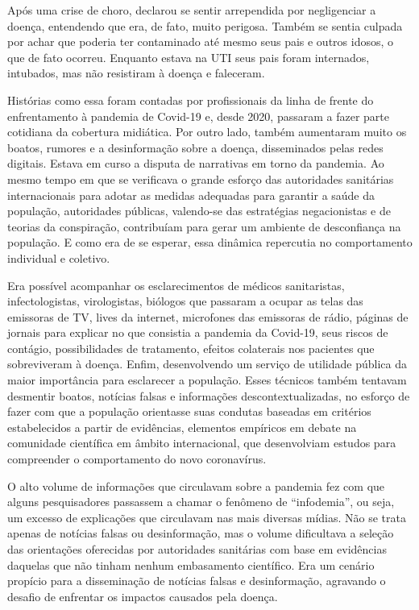 Após uma crise de choro, declarou se sentir arrependida por negligenciar
a doença, entendendo que era, de fato, muito perigosa. Também se sentia
culpada por achar que poderia ter contaminado até mesmo seus pais e
outros idosos, o que de fato ocorreu. Enquanto estava na UTI seus pais
foram internados, intubados, mas não resistiram à doença e faleceram.

Histórias como essa foram contadas por profissionais da linha de frente
do enfrentamento à pandemia de Covid-19 e, desde 2020, passaram a fazer
parte cotidiana da cobertura midiática. Por outro lado, também
aumentaram muito os boatos, rumores e a desinformação sobre a doença,
disseminados pelas redes digitais. Estava em curso a disputa de
narrativas em torno da pandemia. Ao mesmo tempo em que se verificava o
grande esforço das autoridades sanitárias internacionais para adotar as
medidas adequadas para garantir a saúde da população, autoridades
públicas, valendo-se das estratégias negacionistas e de teorias da
conspiração, contribuíam para gerar um ambiente de desconfiança na
população. E como era de se esperar, essa dinâmica repercutia no
comportamento individual e coletivo.

Era possível acompanhar os esclarecimentos de médicos sanitaristas,
infectologistas, virologistas, biólogos que passaram a ocupar as telas
das emissoras de TV, lives da internet, microfones das emissoras de
rádio, páginas de jornais para explicar no que consistia a pandemia da
Covid-19, seus riscos de contágio, possibilidades de tratamento, efeitos
colaterais nos pacientes que sobreviveram à doença. Enfim, desenvolvendo
um serviço de utilidade pública da maior importância para esclarecer a
população. Esses técnicos também tentavam desmentir boatos, notícias
falsas e informações descontextualizadas, no esforço de fazer com que a
população orientasse suas condutas baseadas em critérios estabelecidos a
partir de evidências, elementos empíricos em debate na comunidade
científica em âmbito internacional, que desenvolviam estudos para
compreender o comportamento do novo coronavírus.

O alto volume de informações que circulavam sobre a pandemia fez com que
alguns pesquisadores passassem a chamar o fenômeno de ``infodemia'', ou
seja, um excesso de explicações que circulavam nas mais diversas mídias.
Não se trata apenas de notícias falsas ou desinformação, mas o volume
dificultava a seleção das orientações oferecidas por autoridades
sanitárias com base em evidências daquelas que não tinham nenhum
embasamento científico. Era um cenário propício para a disseminação de
notícias falsas e desinformação, agravando o desafio de enfrentar os
impactos causados pela doença.

